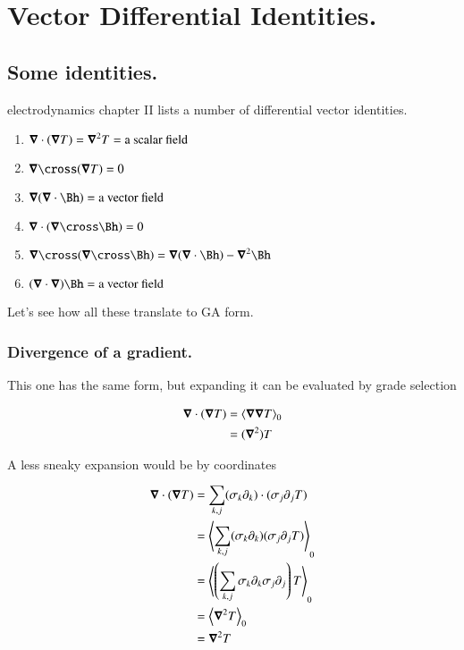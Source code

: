 \chapter{Vector Differential Identities.}

\section{Some identities. }

\cite{feynman1963flp} electrodynamics chapter II lists a number of
differential vector identities.

\begin{enumerate}
\item $\boldsymbol{\nabla} \cdot (\boldsymbol{\nabla} T) = \boldsymbol{\nabla}^2 T = \mbox{a scalar field}$
\item $\spacegrad \cross (\spacegrad T) = 0$
\item $\spacegrad (\spacegrad \cdot \Bh) = \mbox{a vector field}$
\item $\spacegrad \cdot (\spacegrad \cross \Bh) = 0$
\item $\spacegrad \cross (\spacegrad \cross \Bh) = \spacegrad(\spacegrad \cdot \Bh) - \spacegrad^2 \Bh$
\item $(\spacegrad \cdot \spacegrad) \Bh = \mbox{a vector field}$
\end{enumerate}

Let's see how all these translate to GA form.

\subsection{Divergence of a gradient. }

This one has the same form, but expanding it can be evaluated by grade
selection

\begin{align*}
\boldsymbol{\nabla} \cdot (\boldsymbol{\nabla} T) 
&= {\left\langle{{\boldsymbol{\nabla}\boldsymbol{\nabla}T}}\right\rangle}_{0} \\
&= (\boldsymbol{\nabla}^2) T
\end{align*}

A less sneaky expansion would be by coordinates

\begin{align*}
\boldsymbol{\nabla} \cdot (\boldsymbol{\nabla} T) 
&= {\sum_{k,j} (\sigma_k \partial_k) \cdot (\sigma_j \partial_j T)} \\
&= {\left\langle{{\sum_{k,j} (\sigma_k \partial_k) (\sigma_j \partial_j T)}}\right\rangle}_{0} \\
&= {\left\langle{{\left(\sum_{k,j} \sigma_k \partial_k \sigma_j \partial_j\right) T}}\right\rangle}_{0} \\
&= {\left\langle{{\boldsymbol{\nabla}^2 T}}\right\rangle}_{0} \\
&= \boldsymbol{\nabla}^2 T \\
\end{align*}

